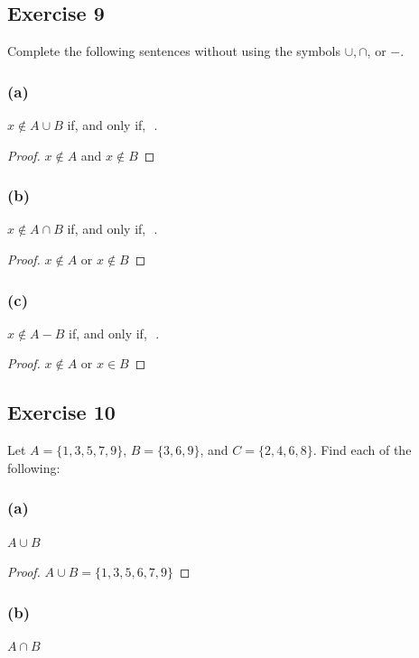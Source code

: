 \documentclass[14pt]{extarticle}
\newcommand{\fbl}{\underline{\hspace{1cm}}\,\,}
\begin{document}
\subsection{Exercise 9}
Complete the following sentences without using the symbols \(\cup, \cap\), or $-$.

\subsubsection{(a)}
\(x \notin A \cup B\) if, and only if, \fbl.

\begin{proof}
\(x \notin A\) and \(x \notin B\)
\end{proof}

\subsubsection{(b)}
\(x \notin A \cap B\) if, and only if, \fbl.

\begin{proof}
\(x \notin A\) or \(x \notin B\)
\end{proof}

\subsubsection{(c)}
\(x \notin A - B\) if, and only if, \fbl.

\begin{proof}
\(x \notin A\) or \(x \in B\)
\end{proof}

\subsection{Exercise 10}
Let \(A = \{1, 3, 5, 7, 9\}\), \(B = \{3, 6, 9\}\), and \(C = \{2, 4, 6, 8\}\). Find each of the following:

\subsubsection{(a)}
\(A \cup B\)

\begin{proof}
\(A \cup B = \{1, 3, 5, 6, 7, 9\}\)
\end{proof}

\subsubsection{(b)}
\(A \cap B\)
\end{document}
